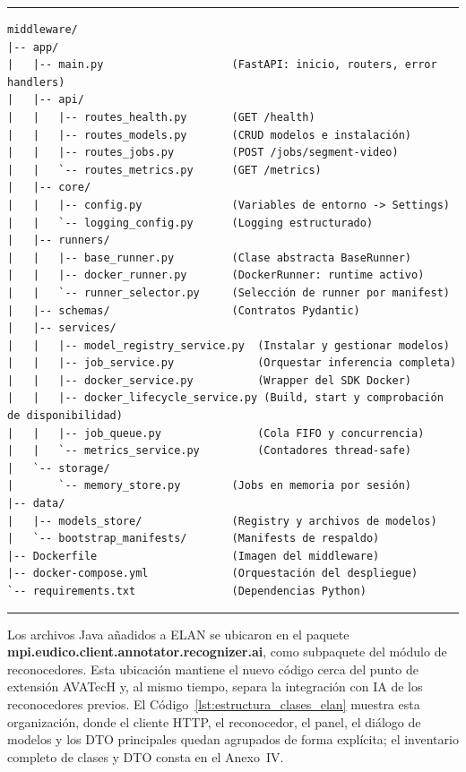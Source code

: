 \begin{center}
\begin{minipage}{0.96\textwidth}
\hrule
\vspace{0.10cm}
\scriptsize
\begin{Verbatim}[baselinestretch=0.72]
middleware/
|-- app/
|   |-- main.py                    (FastAPI: inicio, routers, error handlers)
|   |-- api/
|   |   |-- routes_health.py       (GET /health)
|   |   |-- routes_models.py       (CRUD modelos e instalación)
|   |   |-- routes_jobs.py         (POST /jobs/segment-video)
|   |   `-- routes_metrics.py      (GET /metrics)
|   |-- core/
|   |   |-- config.py              (Variables de entorno -> Settings)
|   |   `-- logging_config.py      (Logging estructurado)
|   |-- runners/
|   |   |-- base_runner.py         (Clase abstracta BaseRunner)
|   |   |-- docker_runner.py       (DockerRunner: runtime activo)
|   |   `-- runner_selector.py     (Selección de runner por manifest)
|   |-- schemas/                   (Contratos Pydantic)
|   |-- services/
|   |   |-- model_registry_service.py  (Instalar y gestionar modelos)
|   |   |-- job_service.py             (Orquestar inferencia completa)
|   |   |-- docker_service.py          (Wrapper del SDK Docker)
|   |   |-- docker_lifecycle_service.py (Build, start y comprobación de disponibilidad)
|   |   |-- job_queue.py               (Cola FIFO y concurrencia)
|   |   `-- metrics_service.py         (Contadores thread-safe)
|   `-- storage/
|       `-- memory_store.py        (Jobs en memoria por sesión)
|-- data/
|   |-- models_store/              (Registry y archivos de modelos)
|   `-- bootstrap_manifests/       (Manifests de respaldo)
|-- Dockerfile                     (Imagen del middleware)
|-- docker-compose.yml             (Orquestación del despliegue)
`-- requirements.txt               (Dependencias Python)
\end{Verbatim}
\vspace{0.03cm}
\hrule

\label{lst:estructura_directorios}
\end{minipage}
\end{center}

Los archivos Java añadidos a ELAN se ubicaron en el paquete \textbf{mpi.eudico.client.annotator.recognizer.ai}, como subpaquete del módulo de reconocedores. Esta ubicación mantiene el nuevo código cerca del punto de extensión AVATecH y, al mismo tiempo, separa la integración con IA de los reconocedores previos. El Código~\ref{lst:estructura_clases_elan} muestra esta organización, donde el cliente HTTP, el reconocedor, el panel, el diálogo de modelos y los DTO principales quedan agrupados de forma explícita; el inventario completo de clases y DTO consta en el Anexo~IV.

